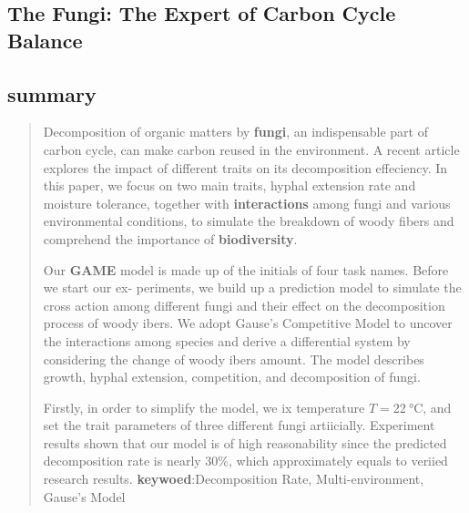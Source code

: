 \documentclass[12pt]{article}
\begin{document}
\begin{center}

\section*{
    The Fungi: The Expert of Carbon Cycle Balance
}

\subsection*{summary}
\end{center}
\begin{quotation}
    Decomposition of organic matters by \textbf{fungi}, an indispensable part of carbon cycle, can
    make carbon reused in the environment. A recent article explores the impact of different
    traits on its decomposition effeciency. In this paper, we focus on two main traits, hyphal
    extension rate and moisture tolerance, together with \textbf{interactions} among fungi and various
    environmental conditions, to simulate the breakdown of woody fibers and comprehend the
    importance of \textbf{biodiversity}.


    Our \textbf{GAME} model is made up of the initials of four task names. 
    Before we start our ex- periments, we build up a prediction 
    model to simulate the cross action among different fungi and 
    their effect on the decomposition process of woody ibers. 
    We adopt Gause’s Competitive Model to uncover the interactions 
    among species and derive a differential system by considering 
    the change of woody ibers amount. The model describes growth, 
    hyphal extension, competition, and decomposition of fungi.

    Firstly, in order to simplify the model, we ix temperature $T=\qty{22}{\degreeCelsius}$, 
    and set the trait parameters of three different fungi artiicially. 
    Experiment results shown that our model is of high reasonability since 
    the predicted decomposition rate is nearly 30\%, 
    which approximately equals to veriied research results.
{\tiny }
    \textbf{keywoed}:Decomposition Rate, Multi-environment, Gause’s Model
    \end{quotation}


    
\end{document}
